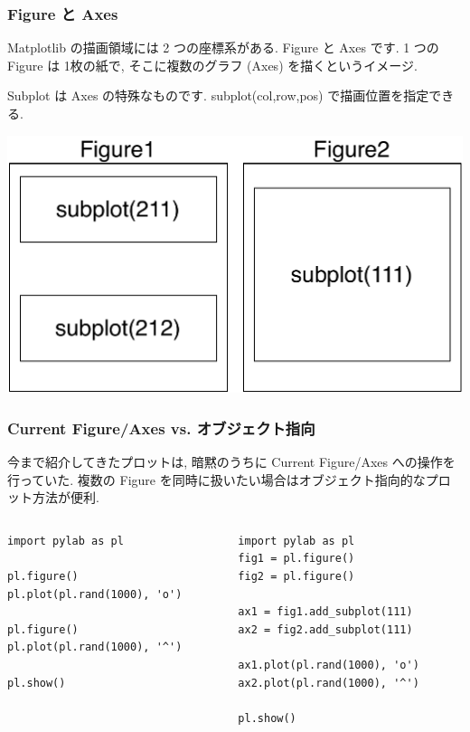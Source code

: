 \begin{frame}[t,fragile]
\frametitle{Figure と Axes}
Matplotlib の描画領域には 2 つの座標系がある. 
Figure と Axes です. 1 つの Figure は 1枚の紙で, そこに複数のグラフ (Axes) を描くというイメージ. 

Subplot は Axes の特殊なものです. subplot(col,row,pos) で描画位置を指定できる. 

\begin{center}
\includegraphics[scale=0.4]{fig_ax.pdf}
\end{center}
\end{frame}

\begin{frame}[t,fragile]
\frametitle{Current Figure/Axes vs. オブジェクト指向}
今まで紹介してきたプロットは, 暗黙のうちに Current Figure/Axes への操作を行っていた. 複数の Figure を同時に扱いたい場合はオブジェクト指向的なプロット方法が便利.

\begin{columns}
\begin{column}{.52\textwidth}
\begin{lstlisting}
import pylab as pl

pl.figure() 
pl.plot(pl.rand(1000), 'o')

pl.figure()
pl.plot(pl.rand(1000), '^')

pl.show()
\end{lstlisting}
\end{column}

\begin{column}{.52\textwidth}
\begin{lstlisting}
import pylab as pl
fig1 = pl.figure() 
fig2 = pl.figure()

ax1 = fig1.add_subplot(111)  
ax2 = fig2.add_subplot(111)  

ax1.plot(pl.rand(1000), 'o')
ax2.plot(pl.rand(1000), '^')

pl.show()
\end{lstlisting}
\end{column}
\end{columns}
\end{frame}

